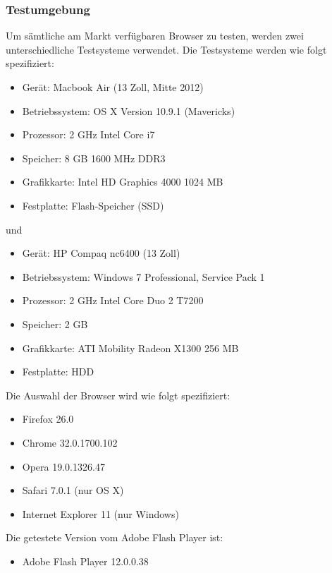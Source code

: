 \subsubsection{Testumgebung}

Um sämtliche am Markt verfügbaren Browser zu testen, werden zwei
unterschiedliche Testsysteme verwendet. Die Testsysteme werden wie folgt
spezifiziert:
\begin{itemize}
  \item Gerät: Macbook Air (13 Zoll, Mitte 2012)
  \item Betriebssystem: OS X Version 10.9.1 (Mavericks)
  \item Prozessor: 2 GHz Intel Core i7
  \item Speicher: 8 GB 1600 MHz DDR3
  \item Grafikkarte: Intel HD Graphics 4000 1024 MB
  \item Festplatte: Flash-Speicher (SSD)
\end{itemize}
und
\begin{itemize}
  \item Gerät: HP Compaq nc6400 (13 Zoll)
  \item Betriebssystem: Windows 7 Professional, Service Pack 1
  \item Prozessor: 2 GHz Intel Core Duo 2 T7200
  \item Speicher: 2 GB
  \item Grafikkarte: ATI Mobility Radeon X1300 256 MB
  \item Festplatte: HDD
\end{itemize}

\newline\newline
Die Auswahl der Browser wird wie folgt spezifiziert:
\begin{itemize}
  \item Firefox 26.0
  \item Chrome 32.0.1700.102
  \item Opera 19.0.1326.47
  \item Safari 7.0.1 (nur OS X)
  \item Internet Explorer 11 (nur Windows)
\end{itemize}

\newline\newline
Die getestete Version vom Adobe Flash Player ist:
\begin{itemize}
  \item Adobe Flash Player 12.0.0.38
\end{itemize}

